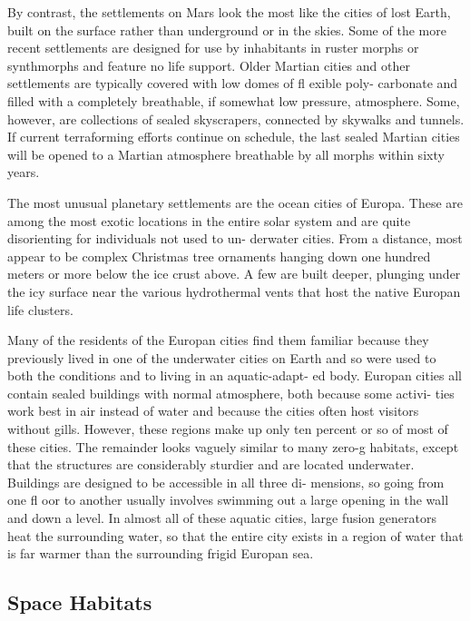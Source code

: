 By contrast, the settlements on Mars look the most 
like the cities of lost Earth, built on the surface rather 
than underground or in the skies. Some of the more 
recent settlements are designed for use by inhabitants 
in ruster morphs or synthmorphs and feature no life 
support. Older Martian cities and other settlements 
are typically covered with low domes of fl exible poly-
carbonate and filled with a completely breathable, if 
somewhat low pressure, atmosphere. Some, however, 
are collections of sealed skyscrapers, connected by 
skywalks and tunnels. If current terraforming efforts 
continue on schedule, the last sealed Martian cities 
will be opened to a Martian atmosphere breathable 
by all morphs within sixty years.

The most unusual planetary settlements are the 
ocean cities of Europa. These are among the most 
exotic locations in the entire solar system and are 
quite disorienting for individuals not used to un-
derwater cities. From a distance, most appear to be 
complex Christmas tree ornaments hanging down one 
hundred meters or more below the ice crust above. A 
few are built deeper, plunging under the icy surface 
near the various hydrothermal vents that host the 
native Europan life clusters.

Many of the residents of the Europan cities find 
them familiar because they previously lived in one of 
the underwater cities on Earth and so were used to 
both the conditions and to living in an aquatic-adapt-
ed body. Europan cities all contain sealed buildings 
with normal atmosphere, both because some activi-
ties work best in air instead of water and because the 
cities often host visitors without gills. However, these 
regions make up only ten percent or so of most of 
these cities. The remainder looks vaguely similar to 
many zero-g habitats, except that the structures are 
considerably sturdier and are located underwater. 
Buildings are designed to be accessible in all three di-
mensions, so going from one fl oor to another usually 
involves swimming out a large opening in the wall 
and down a level. In almost all of these aquatic cities, 
large fusion generators heat the surrounding water, so 
that the entire city exists in a region of water that is 
far warmer than the surrounding frigid Europan sea.

\subsection{Space Habitats}

